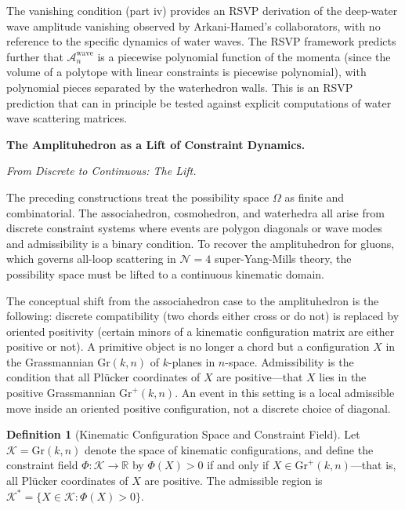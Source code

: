 \documentclass[11pt]{article}
\theoremstyle{plain}
\theoremstyle{definition}
\newtheorem{definition}[theorem]{Definition}
\theoremstyle{remark}
\newcommand{\R}{\mathbb{R}}
\newcommand{\Gr}{\mathrm{Gr}}
\newcommand{\Phif}{\Phi}
\newcommand{\OmKS}{\Omega}
\newcommand{\Amp}{\mathcal{A}}
\begin{document}
The vanishing condition (part iv) provides an RSVP derivation of the deep-water wave amplitude vanishing observed by Arkani-Hamed's collaborators, with no reference to the specific dynamics of water waves. The RSVP framework predicts further that $\Amp_n^{\mathrm{wave}}$ is a piecewise polynomial function of the momenta (since the volume of a polytope with linear constraints is piecewise polynomial), with polynomial pieces separated by the waterhedron walls. This is an RSVP prediction that can in principle be tested against explicit computations of water wave scattering matrices.

\bigskip\noindent\textbf{The Amplituhedron as a Lift of Constraint Dynamics.}
\label{sec:amplituhedron}

\medskip\noindent\textit{From Discrete to Continuous: The Lift.}

The preceding constructions treat the possibility space $\OmKS$ as finite and combinatorial. The associahedron, cosmohedron, and waterhedra all arise from discrete constraint systems where events are polygon diagonals or wave modes and admissibility is a binary condition. To recover the amplituhedron for gluons, which governs all-loop scattering in $\mathcal{N}=4$ super-Yang-Mills theory, the possibility space must be lifted to a continuous kinematic domain.

The conceptual shift from the associahedron case to the amplituhedron is the following: discrete compatibility (two chords either cross or do not) is replaced by oriented positivity (certain minors of a kinematic configuration matrix are either positive or not). A primitive object is no longer a chord but a configuration $X$ in the Grassmannian $\Gr(k,n)$ of $k$-planes in $n$-space. Admissibility is the condition that all Pl\"ucker coordinates of $X$ are positive---that $X$ lies in the positive Grassmannian $\mathrm{Gr}^+(k,n)$. An event in this setting is a local admissible move inside an oriented positive configuration, not a discrete choice of diagonal.

\begin{definition}[Kinematic Configuration Space and Constraint Field]
Let $\mathcal{K} = \Gr(k,n)$ denote the space of kinematic configurations, and define the constraint field $\Phif: \mathcal{K} \to \R$ by $\Phif(X) > 0$ if and only if $X \in \mathrm{Gr}^+(k,n)$---that is, all Pl\"ucker coordinates of $X$ are positive. The admissible region is $\mathcal{K}^* = \{X \in \mathcal{K} : \Phif(X) > 0\}$.
\end{definition}
\end{document}
